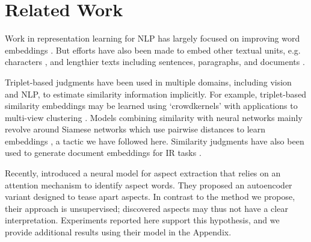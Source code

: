 \documentclass[11pt,a4paper]{article}
\begin{document}
\section{Related Work}
\label{section:related-work}

Work in representation learning for NLP has largely focused on improving word embeddings \cite{levy2014dependency,faruqui2014retrofitting,huang2012improving}. But efforts have also been made to embed other textual units, e.g. characters \cite{kim2016character}, and lengthier texts including sentences, paragraphs, and documents \cite{le2014distributed,kiros2015skip}. 

Triplet-based judgments have been used in multiple domains, including vision and NLP, to estimate similarity information implicitly. For example, triplet-based similarity embeddings may be learned using `crowdkernels' with applications to multi-view clustering \cite{amid2015multiview}. Models combining similarity with neural networks mainly revolve around Siamese networks \cite{chopra2005learning} which use pairwise distances to learn embeddings \cite{schroff2015facenet}, a tactic we have followed here. Similarity judgments have also been used to generate document embeddings for IR tasks \cite{shen2014latent,das2016together}.%

Recently,  introduced a neural model for aspect extraction that relies on an attention mechanism to identify aspect words. They proposed an autoencoder variant designed to tease apart aspects. In contrast to the method we propose, their approach is unsupervised; discovered aspects may thus not have a clear interpretation. Experiments reported here support this hypothesis, and we provide additional results using their model in the Appendix. 



\end{document}
